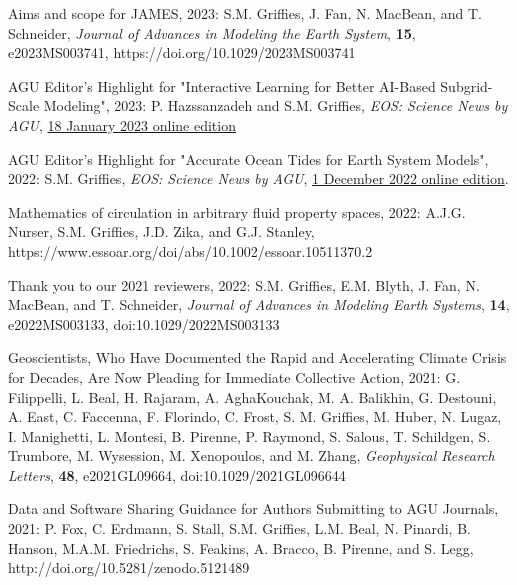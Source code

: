 \begin{etaremune}

\item Aims and scope for JAMES, 2023: S.M. Grif\/f\/ies, J. Fan, N. MacBean, and T. Schneider, {\it Journal of Advances in Modeling the Earth System}, {\bf 15}, e2023MS003741, 
https://doi.org/10.1029/2023MS003741

\item AGU Editor's Highlight for "Interactive Learning for Better AI-Based Subgrid-Scale Modeling", 2023: P. Hazssanzadeh and S.M. Grif\/f\/ies, {\it EOS: Science News by AGU}, \href{https://eos.org/editor-highlights/interactive-learning-for-better-ai-based-subgrid-scale-modeling}{18 January 2023 online edition} 

\item AGU Editor's Highlight for "Accurate Ocean Tides for Earth System Models", 2022: S.M. Grif\/f\/ies, {\it EOS: Science News by AGU}, \href{https://eos.org/editor-highlights/accurate-ocean-tides-for-earth-system-models}{1 December 2022 online edition}. 

\item Mathematics of circulation in arbitrary fluid property spaces, 2022: A.J.G. Nurser, S.M. Grif\/f\/ies, J.D. Zika, and G.J. Stanley,  https://www.essoar.org/doi/abs/10.1002/essoar.10511370.2

\item Thank you to our 2021 reviewers, 2022:  S.M. Grif\/f\/ies, E.M. Blyth, J. Fan, N. MacBean, and  T. Schneider, {\it Journal of Advances in Modeling Earth Systems}, {\bf 14}, e2022MS003133, doi:10.1029/2022MS003133

\item Geoscientists, Who Have Documented the Rapid and Accelerating Climate Crisis for Decades, Are Now Pleading for Immediate Collective Action, 2021: 
G. Filippelli, L. Beal, H. Rajaram, A. AghaKouchak, M. A. Balikhin, G. Destouni, A. East, C. Faccenna, F. Florindo, C. Frost, S. M. Grif\/f\/ies, M. Huber, N. Lugaz, I. Manighetti, L. Montesi, B. Pirenne, P. Raymond, S. Salous, T. Schildgen, S. Trumbore, M. Wysession, M. Xenopoulos, and M. Zhang, {\it Geophysical Research Letters}, {\bf 48}, e2021GL09664, doi:10.1029/2021GL096644

\item Data and Software Sharing Guidance for Authors Submitting to AGU Journals, 2021: P. Fox, C. Erdmann, S. Stall, S.M. Grif\/f\/ies, L.M. Beal, N. Pinardi, B. Hanson, M.A.M. Friedrichs, S. Feakins, A. Bracco, B. Pirenne, and S. Legg,  http://doi.org/10.5281/zenodo.5121489


\end{etaremune}
